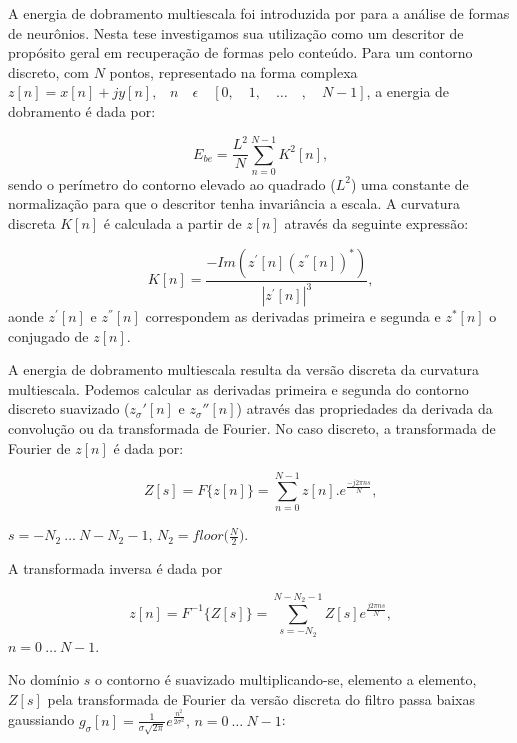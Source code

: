 A energia de dobramento multiescala foi introduzida por  para a análise de formas de neurônios. Nesta tese investigamos sua utilização como um descritor de propósito geral em recuperação de formas pelo conteúdo. Para um contorno discreto, com $N$ pontos, representado na forma complexa $z[n] = x[n]+jy[n] \text{,} \quad n \quad \epsilon \quad [0, \quad 1, \quad \ldots \quad , \quad N-1]$, a energia de dobramento é dada por: 

\begin{equation}
E_{be} = \frac{L^{2}}{N}\sum_{n=0}^{N-1}K^{2}[n]\text{,}
\label{eq:ebe}
\end{equation}
\noindent
sendo o perímetro do contorno elevado ao quadrado ($L^2$) uma constante de normalização para que o descritor tenha invariância a escala. A curvatura discreta $K[n]$ é calculada a partir de $z[n]$ através da seguinte expressão:

\begin{equation}
K[n] = \frac{-Im(z^{'}[n](z^{''}[n])^{*})}{|z^{'}[n]|^3} \text{,}
\label{eq:kn}
\end{equation}
\noindent
aonde $z^{'}[n]$ e $z^{''}[n]$ correspondem as derivadas primeira e segunda e $z^{*}[n]$ o conjugado de $z[n]$. 

A energia de dobramento multiescala resulta da versão discreta da curvatura multiescala. Podemos calcular as derivadas primeira e segunda do contorno discreto suavizado ($z_\sigma'[n]$ e $z_\sigma''[n]$) através das propriedades da derivada da convolução ou da transformada de Fourier. No caso discreto, a transformada de Fourier de $z[n]$ é dada por:  

\begin{equation}
Z[s] = F\big\{z[n]\big\} = \sum\limits_{n=0}^{N-1}z[n].e^{\frac{-j2\pi ns}{N}} \text{,}
\end{equation}

$s = -N_{2}\: \ldots \: N-N_{2}-1\text{, }N_{2}=floor\big(\frac{N}{2}\big)$.

 A transformada inversa é dada por  

\begin{equation}
z[n] = F^{-1}\big\{Z[s]\big\} = \sum\limits_{s = -N_{2}}^{N-N_{2}-1}Z[s]e^{\frac{j2\pi n s}{N}}\text{,}
\end{equation}
 $ n = 0\: \ldots \: N-1$.
  
No domínio $s$ o contorno é suavizado multiplicando-se, elemento a elemento, $Z[s]$ pela transformada de Fourier da versão discreta do filtro passa baixas gaussiando $g_\sigma[n] = \frac{1}{\sigma\sqrt{2\pi}}e^{\frac{n^2}{2\sigma^2}}\text{, } 
n = 0 \: \ldots \: N-1$:


